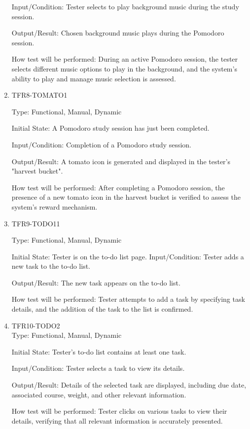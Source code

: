 \documentclass[12pt, titlepage]{article}
\begin{document}
\begin{enumerate}
Input/Condition: Tester selects to play background music during the study session.

Output/Result: Chosen background music plays during the Pomodoro session.

How test will be performed: During an active Pomodoro session, the tester selects different music options to play in the background, and the system's ability to play and manage music selection is assessed.

\item{TFR8-TOMATO1\\}\label{TFR8-TOMATO1}

Type: Functional, Manual, Dynamic

Initial State: A Pomodoro study session has just been completed.

Input/Condition: Completion of a Pomodoro study session.

Output/Result: A tomato icon is generated and displayed in the tester's "harvest bucket".

How test will be performed: After completing a Pomodoro session, the presence of a new tomato icon in the harvest bucket is verified to assess the system's reward mechanism.

\item{TFR9-TODO11\\}\label{TFR9-TODO1}

Type: Functional, Manual, Dynamic

Initial State: Tester is on the to-do list page.
Input/Condition: Tester adds a new task to the to-do list.

Output/Result: The new task appears on the to-do list.

How test will be performed: Tester attempts to add a task by specifying task details, and the addition of the task to the list is confirmed.

\item{TFR10-TODO2\\}\label{TFR10-TODO2}
Type: Functional, Manual, Dynamic

Initial State: Tester's to-do list contains at least one task.

Input/Condition: Tester selects a task to view its details.

Output/Result: Details of the selected task are displayed, including due date, associated course, weight, and other relevant information.

How test will be performed: Tester clicks on various tasks to view their details, verifying that all relevant information is accurately presented.



\end{enumerate}
\end{document}
